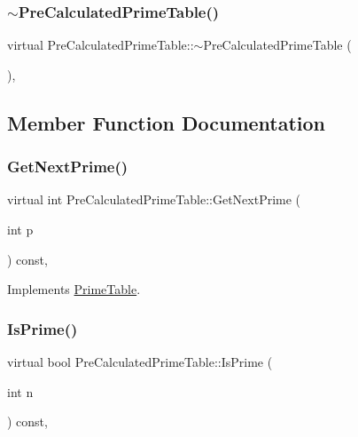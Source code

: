 \subsubsection{\texorpdfstring{$\sim$\+Pre\+Calculated\+Prime\+Table()}{~PreCalculatedPrimeTable()}}
{\footnotesize\ttfamily virtual Pre\+Calculated\+Prime\+Table\+::$\sim$\+Pre\+Calculated\+Prime\+Table (\begin{DoxyParamCaption}{ }\end{DoxyParamCaption})\hspace{0.3cm}{\ttfamily [inline]}, {\ttfamily [virtual]}}



\subsection{Member Function Documentation}
\mbox{\label{class_pre_calculated_prime_table_a0ff10b1fe13df7e56b8d7ed9f41d3998}} 
\subsubsection{\texorpdfstring{Get\+Next\+Prime()}{GetNextPrime()}}
{\footnotesize\ttfamily virtual int Pre\+Calculated\+Prime\+Table\+::\+Get\+Next\+Prime (\begin{DoxyParamCaption}\item[{int}]{p }\end{DoxyParamCaption}) const\hspace{0.3cm}{\ttfamily [inline]}, {\ttfamily [virtual]}}



Implements \hyperlink{class_prime_table_ae537c939f56617d8937d57bbbae3ab30}{Prime\+Table}.

\mbox{\label{class_pre_calculated_prime_table_a8a9ab7f99b09e5e987933c260e7304cf}} 
\subsubsection{\texorpdfstring{Is\+Prime()}{IsPrime()}}
{\footnotesize\ttfamily virtual bool Pre\+Calculated\+Prime\+Table\+::\+Is\+Prime (\begin{DoxyParamCaption}\item[{int}]{n }\end{DoxyParamCaption}) const\hspace{0.3cm}{\ttfamily [inline]}, {\ttfamily [virtual]}}



